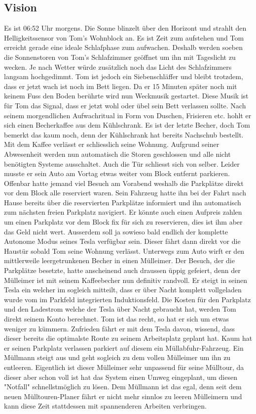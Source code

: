 \subsection{Vision}
Es ist 06:52 Uhr morgens. Die Sonne blinzelt über den Horizont und strahlt den Helligkeitssensor von Tom's Wohnblock an. Es ist Zeit zum aufstehen und Tom erreicht gerade eine ideale Schlafphase zum aufwachen. Deshalb werden soeben die Sonnenstoren von Tom's Schlafzimmer geöffnet um ihn mit Tageslicht zu wecken. Je nach Wetter würde zusätzlich noch das Licht des Schlafzimmers langsam hochgedimmt. Tom ist jedoch ein Siebenschläffer und bleibt trotzdem, dass er jetzt wach ist noch im Bett liegen. Da er 15 Minuten später noch mit keinem Fuss den Boden berührte wird nun Weckmusik gestartet. Diese Musik ist für Tom das Signal, dass er jetzt wohl oder übel sein Bett verlassen sollte.  Nach seinem morgendlichen Aufwachritual in Form von Duschen, Frisieren etc. hohlt er sich einen Becherkaffee aus dem Kühlschrank. Es ist der letzte Becher, doch Tom bemerkt das kaum noch, denn der Kühlschrank hat bereits Nachschub bestellt. Mit dem Kaffee verlässt er schliesslich seine Wohnung. Aufgrund seiner Abwesenheit werden nun automatisch die Storen geschlossen und alle nicht benötigten Systeme ausschaltet. Auch die Tür schliesst sich von selber. Leider musste er sein Auto am Vortag etwas weiter vom Block entfernt parkieren. Offenbar hatte jemand viel Besuch am Vorabend weshalb die Parkplätze direkt vor dem Block alle reserviert waren. Sein Fahrzeug hatte ihn bei der Fahrt nach Hause bereits über die reservierten Parkplätze informiert und ihn automatisch zum nächsten freien Parkplatz navigiert. Er könnte auch einen Aufpreis zahlen um einen Parkplatz vor dem Block fix für sich zu reservieren, dies ist ihm aber das Geld nicht wert. Ausserdem soll ja sowieso bald endlich der komplette Autonome Modus seines Tesla verfügbar sein. Dieser fährt dann direkt vor die Haustür sobald Tom seine Wohnung verlässt. Unterwegs zum Auto wirft er den mittlerweile leergetrunkenen Becher in einen Mülleimer. Der Besuch, der die Parkplätze besetzte, hatte anscheinend auch draussen üppig gefeiert, denn der Mülleimer ist mit seinem Kaffeebecher nun definitiv randvoll. Er steigt in seinen Tesla ein welcher im sogleich mitteilt, dass er über Nacht komplett vollgeladen wurde vom im Parkfeld integrierten Induktionsfeld. Die Kosten für den Parkplatz und den Ladestrom welche der Tesla über Nacht gebraucht hat, werden Tom direkt seinem Konto berechnet. Tom ist das recht, so hat er sich um etwas weniger zu kümmern. Zufrieden fährt er mit dem Tesla davon, wissend, dass dieser bereits die optimalste Route zu seinem Arbeitsplatz geplant hat. Kaum hat er seinen Parkplatz verlassen parkiert auf diesem ein Müllabfuhr-Fahrzeug. Ein Müllmann steigt aus und geht sogleich zu dem vollen Mülleimer um ihn zu entleeren. Eigentlich ist dieser Mülleimer sehr unpassend für seine Mülltour, da dieser aber schon voll ist hat das System einen Umweg eingeplant, um diesen "Notfall" schnellstmöglich zu lösen. Dem Müllmann ist das egal, denn seit dem neuen Mülltouren-Planer fährt er nicht mehr sinnlos zu leeren Mülleimern und kann diese Zeit stattdessen mit spannenderen Arbeiten verbringen.

